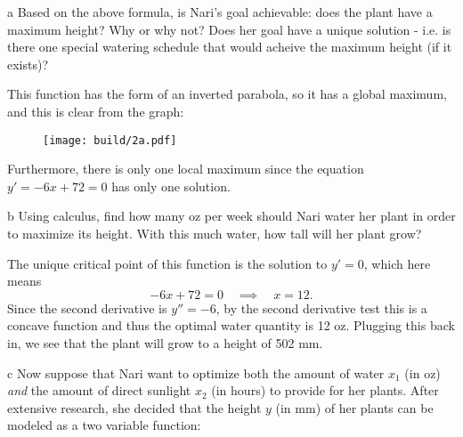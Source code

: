 \documentclass[expanded]{pset}
\begin{document}
\begin{parts}
  \begin{part}{a}
    Based on the above formula, is Nari's goal achievable: does the plant have a maximum height? Why or why not? Does her goal have a unique solution - i.e. is there one special watering schedule that would acheive the maximum height (if it exists)?

  \end{part}

  This function has the form of an inverted parabola, so it has a global maximum, and this is clear from the graph:

  \begin{figure}[ht]
    \centering
    \texttt{[image: build/2a.pdf]}
  \end{figure}\noindent
  Furthermore, there is only one local maximum since the equation $y'=-6x+72=0$ has only one solution.

  \begin{part}{b}
    Using calculus, find how many oz per week should Nari water her plant in order to maximize its height. With this much water, how tall will her plant grow?

  \end{part}

  The unique critical point of this function is the solution to $y'=0$, which here means
  \[
    -6x+72 = 0 \quad\implies \quad x = 12.
  \]
  Since the second derivative is $y''=-6$, by the second derivative test this is a concave function and 
  thus the optimal water quantity is 12 oz. Plugging this back in, we see that the plant will grow to a height of 502 mm.

  \begin{part}{c}
    Now suppose that Nari want to optimize both the amount of water $x_1$ (in oz) \textit{and} the amount of direct sunlight $x_2$ (in hours) to provide for her plants. After extensive research, she decided that the height $y$ (in mm) of her plants can be modeled as a two variable function:


\end{part}
\end{parts}
\end{document}
